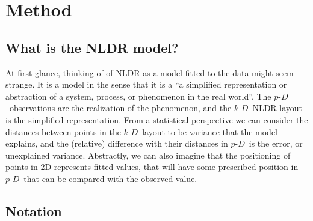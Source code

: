 \documentclass[
  12pt]{article}
\newcommand\pD{$p\text{-}D$\ }
\newcommand\kD{$k\text{-}D$\ }
\begin{document}
\section{Method}\label{sec-method}

\subsection{What is the NLDR model?}\label{what-is-the-nldr-model}

At first glance, thinking of of NLDR as a model fitted to the data might
seem strange. It is a model in the sense that it is a ``a simplified
representation or abstraction of a system, process, or phenomenon in the
real world''. The \pD observations are the realization of the
phenomenon, and the \kD NLDR layout is the simplified representation.
From a statistical perspective we can consider the distances between
points in the \kD layout to be variance that the model explains, and the
(relative) difference with their distances in \pD is the error, or
unexplained variance. Abstractly, we can also imagine that the
positioning of points in 2D represents fitted values, that will have
some prescribed position in \pD that can be compared with the observed
value.

\subsection{Notation}\label{notation}
\end{document}

